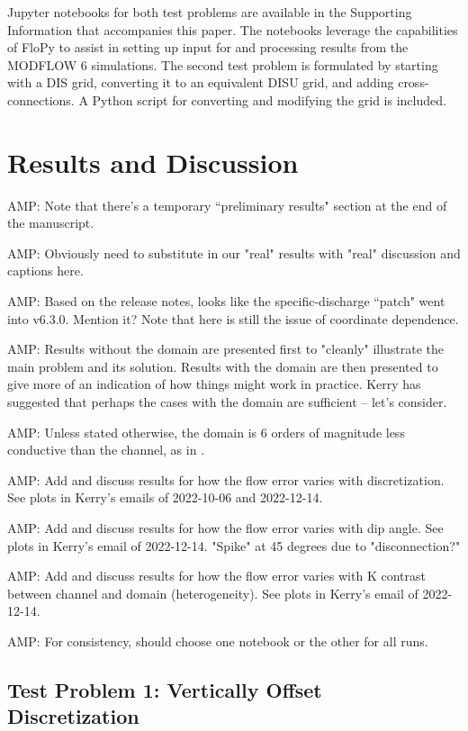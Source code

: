 \documentclass{article}
\begin{document}
Jupyter notebooks for both test problems are available in the Supporting Information that accompanies this paper. The notebooks leverage the capabilities of FloPy \citep{bakker2016scripting} to assist in setting up input for and processing results from the MODFLOW 6 simulations. The second test problem is formulated by starting with a DIS grid, converting it to an equivalent DISU grid, and adding cross-connections. A Python script for converting and modifying the grid is included.

\section{Results and Discussion}

{\color{red} AMP: Note that there's a temporary ``preliminary results" section at the end of the manuscript.}

{\color{red} AMP: Obviously need to substitute in our "real" results with "real" discussion and captions here.}

{\color{red} AMP: Based on the release notes, looks like the specific-discharge ``patch" went into v6.3.0. Mention it? Note that here is still the issue of coordinate dependence.}

{\color{red} AMP: Results without the domain are presented first to "cleanly" illustrate the main problem and its solution. Results with the domain are then presented to give more of an indication of how things might work in practice. Kerry has suggested that perhaps the cases with the domain are sufficient -- let's consider.}

{\color{red} AMP: Unless stated otherwise, the domain is 6 orders of magnitude less conductive than the channel, as in \cite{bardot2022}.}

{\color{red} AMP: Add and discuss results for how the flow error varies with discretization.  See plots in Kerry's emails of 2022-10-06 and 2022-12-14.}

{\color{red} AMP: Add and discuss results for how the flow error varies with dip angle. See plots in Kerry's email of 2022-12-14. "Spike" at 45 degrees due to "disconnection?"}

{\color{red} AMP: Add and discuss results for how the flow error varies with K contrast between channel and domain (heterogeneity).  See plots in Kerry's email of 2022-12-14.}

{\color{red} AMP: For consistency, should choose one notebook or the other for all runs.}

\subsection{Test Problem 1: Vertically Offset Discretization}
\end{document}

